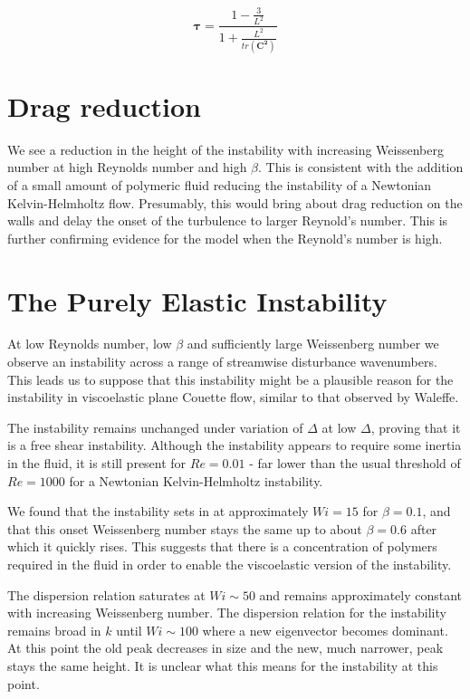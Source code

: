 \documentclass{article}
\begin{document}
\begin{equation}
    \mathbf{\tau} = \frac{1-\frac{3}{L^{2}}}{1 + \frac{L^{2}}{tr(\mathbf{C^{2}})}}
\end {equation}

\section{Drag reduction}

We see a reduction in the height of the instability with increasing Weissenberg number at high Reynolds number and high $\beta$. This is consistent with the addition of a small amount of polymeric fluid reducing the instability of a Newtonian Kelvin-Helmholtz flow. Presumably, this would bring about drag reduction on the walls and delay the onset of the turbulence to larger Reynold's number. This is further confirming evidence for the model when the Reynold's number is high.

\section{The Purely Elastic Instability}

At low Reynolds number, low $\beta$ and sufficiently large Weissenberg number we observe an instability across a range of streamwise disturbance wavenumbers. This leads us to suppose that this instability might be a plausible reason for the instability in viscoelastic plane Couette flow, similar to that observed by Waleffe.

The instability remains unchanged under variation of $\Delta$ at low $\Delta$, proving that it is a free shear instability. Although the instability appears to require some inertia in the fluid, it is still present for  $Re = 0.01$  - far lower than the usual threshold of $Re = 1000$ for a Newtonian Kelvin-Helmholtz instability.

We found that the instability sets in at approximately $Wi = 15$ for $\beta = 0.1$, and that this onset Weissenberg number stays the same up to about $\beta = 0.6$ after which it quickly rises. This suggests that there is a concentration of polymers required in the fluid in order to enable the viscoelastic version of the instability. 

The dispersion relation saturates at $Wi \sim 50$ and remains approximately constant with increasing Weissenberg number. The dispersion relation for the instability remains broad in $k$ until $Wi \sim 100$ where a new eigenvector becomes dominant. At this point the old peak decreases in size and the new, much narrower, peak stays the same height. It is unclear what this means for the instability at this point.
\end{document}

